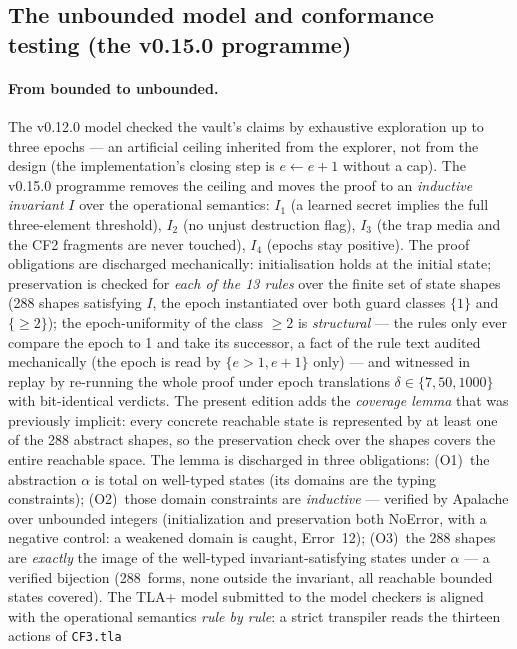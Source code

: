 \documentclass[11pt,a4paper]{article}
\newcommand{\code}[1]{\texttt{\small #1}}
\begin{document}
\subsection{The unbounded model and conformance testing
(the v0.15.0 programme)}\label{sec:v150}

\paragraph{From bounded to unbounded.} The v0.12.0 model checked the
vault's claims by exhaustive exploration up to three epochs --- an
artificial ceiling inherited from the explorer, not from the design (the
implementation's closing step is $e \leftarrow e+1$ without a cap). The
v0.15.0 programme removes the ceiling and moves the proof to an
\emph{inductive invariant} $I$ over the operational semantics:
$I_1$ (a learned secret implies the full three-element threshold),
$I_2$ (no unjust destruction flag), $I_3$ (the trap media and the CF2
fragments are never touched), $I_4$ (epochs stay positive). The proof
obligations are discharged mechanically: initialisation holds at the
initial state; preservation is checked for \emph{each of the 13 rules}
over the finite set of state shapes (288 shapes satisfying $I$, the
epoch instantiated over both guard classes $\{1\}$ and $\{\ge 2\}$); the
epoch-uniformity of the class $\ge 2$ is \emph{structural} --- the
rules only ever compare the epoch to 1 and take its successor, a fact
of the rule text audited mechanically (the epoch is read by
$\{e > 1, e + 1\}$ only) --- and witnessed in replay by re-running the
whole proof under epoch translations $\delta \in \{7, 50, 1000\}$ with
bit-identical verdicts. The present edition adds the \emph{coverage
lemma} that was previously implicit: every concrete reachable state is
represented by at least one of the 288 abstract shapes, so the
preservation check over the shapes covers the entire reachable space.
The lemma is discharged in three obligations: (O1)~the abstraction
$\alpha$ is total on well-typed states (its domains are the typing
constraints); (O2)~those domain constraints are \emph{inductive} ---
verified by Apalache over unbounded integers (initialization and
preservation both NoError, with a negative control: a weakened domain
is caught, Error~12); (O3)~the 288 shapes are \emph{exactly} the image
of the well-typed invariant-satisfying states under $\alpha$ --- a
verified bijection (288~forms, none outside the invariant, all
reachable bounded states covered). The TLA+ model submitted to the
model checkers is aligned with the operational semantics \emph{rule by
rule}: a strict transpiler reads the thirteen actions of \code{CF3.tla}
\end{document}
